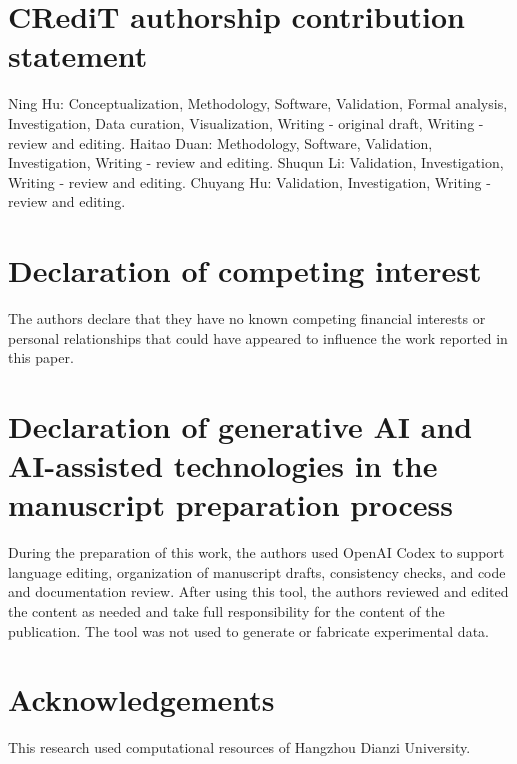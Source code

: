 \documentclass[preprint,12pt,authoryear]{elsarticle}
\begin{document}
\section*{CRediT authorship contribution statement}
Ning Hu: Conceptualization, Methodology, Software, Validation, Formal analysis, Investigation, Data curation, Visualization, Writing - original draft, Writing - review and editing. Haitao Duan: Methodology, Software, Validation, Investigation, Writing - review and editing. Shuqun Li: Validation, Investigation, Writing - review and editing. Chuyang Hu: Validation, Investigation, Writing - review and editing.

\section*{Declaration of competing interest}
The authors declare that they have no known competing financial interests or personal relationships that could have appeared to influence the work reported in this paper.

\section*{Declaration of generative AI and AI-assisted technologies in the manuscript preparation process}
During the preparation of this work, the authors used OpenAI Codex to support language editing, organization of manuscript drafts, consistency checks, and code and documentation review. After using this tool, the authors reviewed and edited the content as needed and take full responsibility for the content of the publication. The tool was not used to generate or fabricate experimental data.

\section*{Acknowledgements}
This research used computational resources of Hangzhou Dianzi University.



\end{document}
